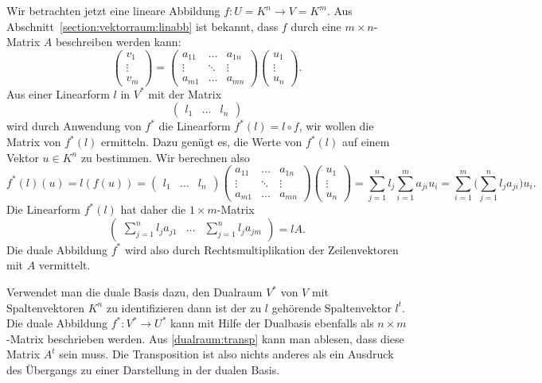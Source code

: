 Wir betrachten jetzt eine lineare Abbildung $f\colon U=K^n\to V=K^m$.
Aus Abschnitt~\ref{section:vektorraum:linabb} ist bekannt, dass
$f$ durch eine $m\times n$-Matrix $A$ beschreiben werden kann:
\[
\begin{pmatrix}
v_1\\\vdots\\v_m
\end{pmatrix}
=
\begin{pmatrix}
a_{11}&\dots &a_{1n}\\
\vdots&\ddots&\vdots\\
a_{m1}&\dots &a_{mn}
\end{pmatrix}
\begin{pmatrix}
u_1\\\vdots\\u_n
\end{pmatrix}.
\]
Aus einer Linearform $l$ in $V^*$ mit der Matrix
\[
\begin{pmatrix}l_1&\dots&l_n\end{pmatrix}
\]
wird durch Anwendung von $f^*$ die Linearform $f^*(l)=l\circ f$, wir
wollen die Matrix von $f^*(l)$ ermitteln.
Dazu genügt es, die Werte von $f^*(l)$ auf einem Vektor $u\in K^n$
zu bestimmen.
Wir berechnen also
\[
f^*(l)(u)
=
l(f(u))
=
\begin{pmatrix}l_1&\dots&l_n\end{pmatrix}
\begin{pmatrix}
a_{11}&\dots &a_{1n}\\
\vdots&\ddots&\vdots\\
a_{m1}&\dots &a_{mn}
\end{pmatrix}
\begin{pmatrix}
u_1\\\vdots\\u_n
\end{pmatrix}
=
\sum_{j=1}^nl_j \sum_{i=1}^m a_{ji}u_i
=
\sum_{i=1}^m
\biggl(
\sum_{j=1}^nl_j a_{ji}
\biggr)
u_i.
\]
Die Linearform $f^*(l)$ hat daher die $1\times m$-Matrix
\begin{equation}
\begin{pmatrix}
\sum_{j=1}^nl_j a_{j1}
&\dots&
\sum_{j=1}^nl_j a_{jm}
\end{pmatrix}
=
lA.
\label{dualraum:transp}
\end{equation}
Die duale Abbildung $f^*$ wird also durch Rechtsmultiplikation der
Zeilenvektoren mit $A$ vermittelt.

Verwendet man die duale Basis dazu, den Dualraum $V^*$ von $V$
mit Spaltenvektoren $K^n$ zu identifizieren dann ist der 
zu $l$ gehörende Spaltenvektor $l^t$.
Die duale Abbildung $f^*\colon V^*\to U^*$ kann mit Hilfe der
Dualbasis ebenfalls als $n\times m$-Matrix beschrieben werden.
Aus \eqref{dualraum:transp} kann man ablesen, dass diese Matrix
$A^t$ sein muss.
Die Transposition ist also nichts anderes als ein Ausdruck des Übergangs
zu einer Darstellung in der dualen Basis.

